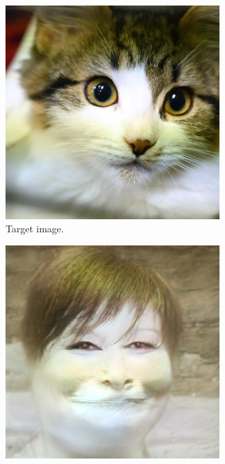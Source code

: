 \documentclass[conference]{IEEEtran}
\theoremstyle{definition}
\theoremstyle{remark}
\theoremstyle{remark}
\begin{document}
\begin{figure}
  \centering
  \begin{subfigure}[b]{0.15\textwidth}
    \centering \includegraphics[width=0.9\textwidth]{figs/ffhq-0.png}
    \caption{Target image.}
  \end{subfigure}
  \begin{subfigure}[b]{0.15\textwidth}
    \centering \includegraphics[width=0.9\textwidth]{figs/ffhq-1.png}

\end{subfigure}
\end{figure}
\end{document}
